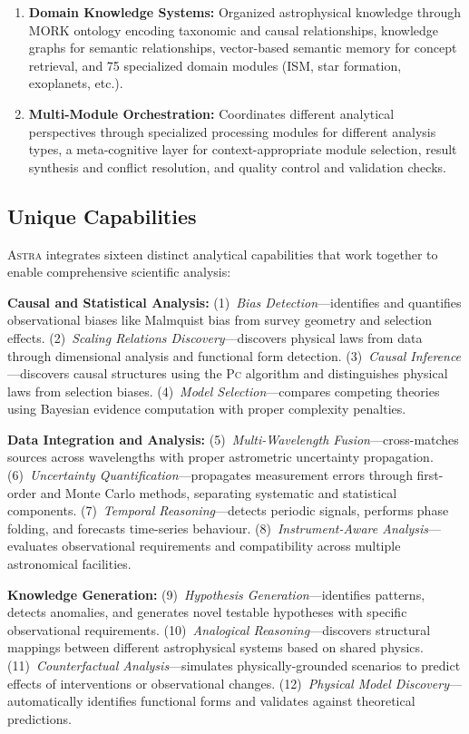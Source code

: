 \documentclass[fleqn,usenatbib]{mnras}
\newcommand{\astra}{\textsc{Astra}\xspace}
\newcommand{\pc}{\textsc{Pc}\xspace}
\begin{document}
\begin{enumerate}
  \item \textbf{Domain Knowledge Systems:}
  Organized astrophysical knowledge through MORK ontology encoding taxonomic and causal relationships, knowledge graphs for semantic relationships, vector-based semantic memory for concept retrieval, and 75 specialized domain modules (ISM, star formation, exoplanets, etc.).

  \item \textbf{Multi-Module Orchestration:}
  Coordinates different analytical perspectives through specialized processing modules for different analysis types, a meta-cognitive layer for context-appropriate module selection, result synthesis and conflict resolution, and quality control and validation checks.
\end{enumerate}

\subsection{Unique Capabilities}
\label{sec:methods:capabilities}

\astra integrates sixteen distinct analytical capabilities that work together to enable comprehensive scientific analysis:

\textbf{Causal and Statistical Analysis:}
(1)~\emph{Bias Detection}---identifies and quantifies observational biases like Malmquist bias from survey geometry and selection effects.
(2)~\emph{Scaling Relations Discovery}---discovers physical laws from data through dimensional analysis and functional form detection.
(3)~\emph{Causal Inference}---discovers causal structures using the \pc algorithm and distinguishes physical laws from selection biases.
(4)~\emph{Model Selection}---compares competing theories using Bayesian evidence computation with proper complexity penalties.

\textbf{Data Integration and Analysis:}
(5)~\emph{Multi-Wavelength Fusion}---cross-matches sources across wavelengths with proper astrometric uncertainty propagation.
(6)~\emph{Uncertainty Quantification}---propagates measurement errors through first-order and Monte Carlo methods, separating systematic and statistical components.
(7)~\emph{Temporal Reasoning}---detects periodic signals, performs phase folding, and forecasts time-series behaviour.
(8)~\emph{Instrument-Aware Analysis}---evaluates observational requirements and compatibility across multiple astronomical facilities.

\textbf{Knowledge Generation:}
(9)~\emph{Hypothesis Generation}---identifies patterns, detects anomalies, and generates novel testable hypotheses with specific observational requirements.
(10)~\emph{Analogical Reasoning}---discovers structural mappings between different astrophysical systems based on shared physics.
(11)~\emph{Counterfactual Analysis}---simulates physically-grounded scenarios to predict effects of interventions or observational changes.
(12)~\emph{Physical Model Discovery}---automatically identifies functional forms and validates against theoretical predictions.
\end{document}
